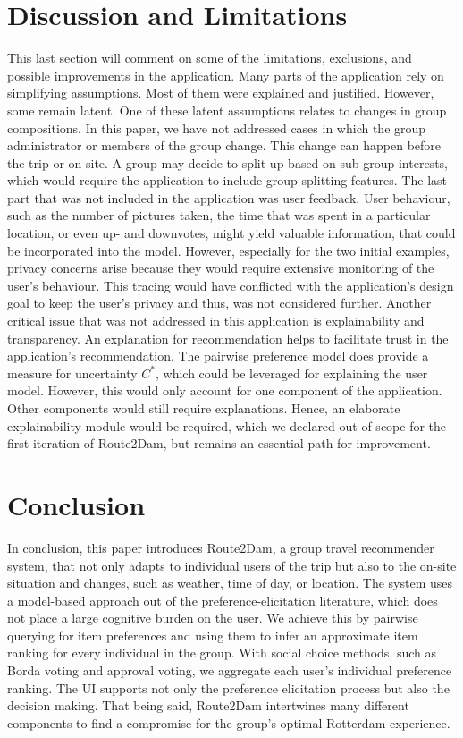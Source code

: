 \documentclass[11pt,a4paper,oneside]{article}
\begin{document}
\section{Discussion and Limitations}
This last section will comment on some of the limitations, exclusions, and possible improvements in the application. Many parts of the application rely on simplifying assumptions. Most of them were explained and justified. However, some remain latent. One of these latent assumptions relates to changes in group compositions. In this paper, we have not addressed cases in which the group administrator or members of the group change. This change can happen before the trip or on-site. A group may decide to split up based on sub-group interests, which would require the application to include group splitting features. The last part that was not included in the application was user feedback. User behaviour, such as the number of pictures taken, the time that was spent in a particular location, or even up- and downvotes, might yield valuable information, that could be incorporated into the model. However, especially for the two initial examples, privacy concerns arise because they would require extensive monitoring of the user's behaviour. This tracing would have conflicted with the application's design goal to keep the user's privacy and thus, was not considered further. Another critical issue that was not addressed in this application is explainability and transparency. An explanation for recommendation helps to facilitate trust in the application's recommendation. The pairwise preference model does provide a measure for uncertainty $C^*$, which could be leveraged for explaining the user model. However, this would only account for one component of the application. Other components would still require explanations. Hence, an elaborate explainability module would be required, which we declared out-of-scope for the first iteration of Route2Dam, but remains an essential path for improvement.

\section{Conclusion}
In conclusion, this paper introduces Route2Dam, a group travel recommender system, that not only adapts to individual users of the trip but also to the on-site situation and changes, such as weather, time of day, or location. The system uses a model-based approach out of the preference-elicitation literature, which does not place a large cognitive burden on the user. We achieve this by pairwise querying for item preferences and using them to infer an approximate item ranking for every individual in the group. With social choice methods, such as Borda voting and approval voting, we aggregate each user's individual preference ranking. The UI supports not only the preference elicitation process but also the decision making. That being said, Route2Dam intertwines many different components to find a compromise for the group's optimal Rotterdam experience.
\end{document}
